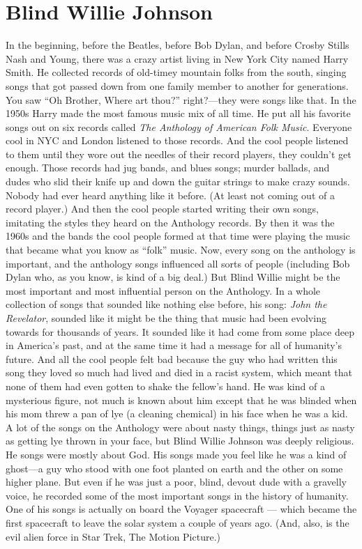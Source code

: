 \documentclass[letterpaper,single]{article}
\begin{document}
\section{Blind Willie Johnson}
In the beginning, before the Beatles, before Bob Dylan, and before Crosby Stills Nash and Young, there was a crazy artist living in New York City named Harry Smith. 
He collected records of old-timey mountain folks from the south, singing songs that got passed down from one family member to another for generations. 
You saw ``Oh Brother, Where art thou?'' right?---they were songs like that. 
In the 1950s Harry made the most famous music mix of all time. 
He put all his favorite songs out on six records called \emph{The Anthology of American Folk Music}. 
Everyone cool in NYC and London listened to those records.
And the cool people listened to them until they wore out the needles of their record players, they couldn't get enough. 
Those records had jug bands, and blues songs; murder ballads, and dudes who slid their knife up and down the guitar strings to make crazy sounds.
Nobody had ever heard anything like it before. (At least not coming out of a record player.)
And then the cool people started writing their own songs, imitating the styles they heard on the Anthology records. 
By then it was the 1960s and the bands the cool people formed at that time were playing the music that became what you know as ``folk'' music.
Now, every song on the anthology is important, and the anthology songs influenced all sorts of people (including Bob Dylan who, as you know, is kind of a big deal.)
But Blind Willie might be the most important and most influential person on the Anthology.
In a whole collection of songs that sounded like nothing else before, his song: \emph{John the Revelator}, sounded like it might be the thing that music had been evolving towards for thousands of years.
It sounded like it had come from some place deep in America's past, and at the same time it had a message for all of humanity's future.
And all the cool people felt bad because the guy who had written this song they loved so much had lived and died in a racist system, which meant that none of them had even gotten to shake the fellow's hand.
He was kind of a mysterious figure, not much is known about him except that he was blinded when his mom threw a pan of lye (a cleaning chemical) in his face when he was a kid.
A lot of the songs on the Anthology were about nasty things, things just as nasty as getting lye thrown in your face, but Blind Willie Johnson was deeply religious. He songs were mostly about God.
His songs made you feel like he was a kind of ghost---a guy who stood with one foot planted on earth and the other on some higher plane.
But even if he was just a poor, blind, devout dude with a gravelly voice, he recorded some of the most important songs in the history of humanity.
One of his songs is actually on board the Voyager spacecraft --- which became the first spacecraft to leave the solar system a couple of years ago. (And, also, is the evil alien force in Star Trek, The Motion Picture.)
\end{document}
